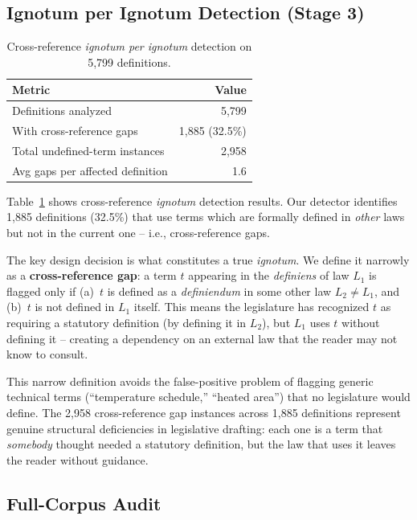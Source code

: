 \documentclass[11pt]{article}
\begin{document}
\subsection{Ignotum per Ignotum Detection (Stage 3)}
\label{sec:exp-ignotum}

\begin{table}[t]
\centering
\caption{Cross-reference \emph{ignotum per ignotum} detection on 5{,}799 definitions.}
\label{tab:ignotum}
\begin{tabular}{lr}
\toprule
\textbf{Metric} & \textbf{Value} \\
\midrule
Definitions analyzed & 5{,}799 \\
With cross-reference gaps & 1{,}885 (32.5\%) \\
Total undefined-term instances & 2{,}958 \\
Avg gaps per affected definition & 1.6 \\
\bottomrule
\end{tabular}
\end{table}

Table~\ref{tab:ignotum} shows cross-reference \emph{ignotum} detection results.
Our detector identifies 1{,}885 definitions (32.5\%) that use terms which are formally defined in \emph{other} laws but not in the current one -- i.e., cross-reference gaps.

The key design decision is what constitutes a true \emph{ignotum}.
We define it narrowly as a \textbf{cross-reference gap}: a term $t$ appearing in the \emph{definiens} of law $L_1$ is flagged only if (a)~$t$ is defined as a \emph{definiendum} in some other law $L_2 \neq L_1$, and (b)~$t$ is not defined in $L_1$ itself.
This means the legislature has recognized $t$ as requiring a statutory definition (by defining it in $L_2$), but $L_1$ uses $t$ without defining it -- creating a dependency on an external law that the reader may not know to consult.

This narrow definition avoids the false-positive problem of flagging generic technical terms (``temperature schedule,'' ``heated area'') that no legislature would define.
The 2{,}958 cross-reference gap instances across 1{,}885 definitions represent genuine structural deficiencies in legislative drafting: each one is a term that \emph{somebody} thought needed a statutory definition, but the law that uses it leaves the reader without guidance.

\subsection{Full-Corpus Audit}
\label{sec:audit}
\end{document}
